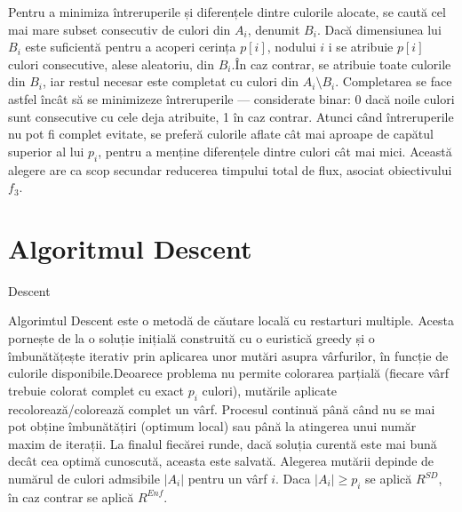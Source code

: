 Pentru a minimiza întreruperile și diferențele dintre culorile alocate, se caută cel mai mare subset consecutiv de culori din $A_i$, denumit $B_i$. Dacă dimensiunea lui $B_i$ este suficientă pentru a acoperi cerința $p[i]$, nodului $i$ i se atribuie $p[i]$ culori consecutive, alese aleatoriu, din $B_i$.În caz contrar, se atribuie toate culorile din $B_i$, iar restul necesar este completat cu culori din $A_i \setminus B_i$. Completarea se face astfel încât să se minimizeze întreruperile — considerate binar: 0 dacă noile culori sunt consecutive cu cele deja atribuite, 1 în caz contrar. Atunci când întreruperile nu pot fi complet evitate, se preferă culorile aflate cât mai aproape de capătul superior al lui $p_i$, pentru a menține diferențele dintre culori cât mai mici. Această alegere are ca scop secundar reducerea timpului total de flux, asociat obiectivului $f_3$.



\section{Algoritmul Descent}
\begin{algorithm}[H]
\caption{Descent}\label{alg:descent_multicoloring}
\begin{algorithmic}[1]
\small
{}
        \Else{}
        \EndIf{}
    \EndFor{}
    \EndIf{}
\EndWhile{}
\EndWhile{}
\end{algorithmic}
\end{algorithm}
Algorimtul Descent  este o metodă de căutare locală cu restarturi multiple. Acesta pornește de la o soluție inițială construită cu o euristică greedy și o îmbunătățește iterativ prin aplicarea unor mutări asupra vârfurilor, în funcție de culorile disponibile.Deoarece problema nu permite colorarea parțială (fiecare vârf trebuie colorat complet cu exact $p_i$ culori), mutările aplicate recolorează/colorează complet un vârf. Procesul continuă până când nu se mai pot obține îmbunătățiri (optimum local) sau până la atingerea unui număr maxim de iterații. La finalul fiecărei runde, dacă soluția curentă este mai bună decât cea optimă cunoscută, aceasta este salvată. Alegerea mutării depinde de numărul de culori admsibile $|A_i|$ pentru un vârf $i$. Daca $|A_i| \geq p_i$ se aplică $R^{SD}$, în caz contrar se aplică $R^{Enf}$.

